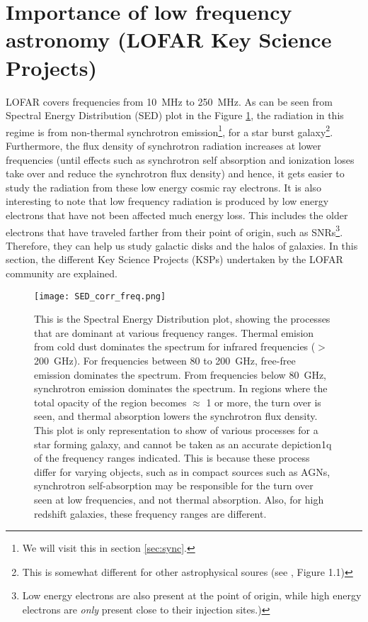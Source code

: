 \documentclass[../main/thesis_msc.tex]{subfiles}
\begin{document}
\section{Importance of low frequency astronomy (LOFAR Key Science Projects)}
LOFAR covers frequencies from 10~MHz to 250~MHz. As can be seen from Spectral Energy Distribution (SED) plot in the Figure \ref{sed}, the radiation in this regime is from non-thermal synchrotron emission\footnote{We will visit this in section \ref{sec:sync}.}, for a star burst galaxy\footnote{This is somewhat different for other astrophysical soures (see \citet{2001isra.book.....T}, Figure 1.1)}. Furthermore, the flux density of synchrotron radiation increases at lower frequencies (until effects such as synchrotron self absorption and ionization loses take over and reduce the synchrotron flux density) and hence, it gets easier to study the radiation from these low energy cosmic ray electrons. It is also interesting to note that low frequency radiation is produced by low energy electrons that have not been affected much energy loss. This includes the older electrons that have traveled farther from their point of origin, such as SNRs\footnote{Low energy electrons are also present at the point of origin, while high energy electrons are \textit{only} present close to their injection sites.)}. Therefore, they can help us study galactic disks and the halos of galaxies. In this section, the different Key Science Projects (KSPs) undertaken by the LOFAR community are explained.
\begin{figure}
\centering
\texttt{[image: SED\_corr\_freq.png]}
\caption{This is the Spectral Energy Distribution plot, showing the processes that are dominant at various frequency ranges. Thermal emision from cold dust dominates the spectrum for infrared frequencies ($>$200~GHz). For frequencies between 80 to 200~GHz, free-free emission dominates the spectrum. From frequencies below 80~GHz, synchrotron emission dominates the spectrum. In regions where the total opacity of the region becomes $\approx$ 1 or more, the turn over is seen, and thermal absorption lowers the synchrotron flux density. This plot is only representation to show of various processes for a star forming galaxy, and cannot be taken as an accurate depiction1q of the frequency ranges indicated. This is because these process differ for varying objects, such as in compact sources such as AGNs, synchrotron self-absorption may be responsible for the turn over seen at low frequencies, and not thermal absorption. Also, for high redshift galaxies, these frequency ranges are different.}
\label{sed}
\end{figure}
\end{document}
